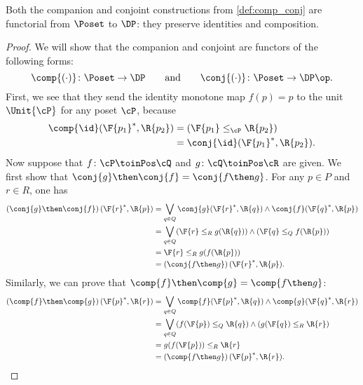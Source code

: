 \begin{lemma}
\label{prop:comp_conj}
Both the companion and conjoint constructions from \cref{def:comp_conj} are functorial from $\Poset$ to $\DP$: they preserve identities and composition.
\end{lemma}
\begin{proof}
We will show that the companion and conjoint are functors of the following forms:
\begin{equation}
\comp{(\cdot)}\colon\Poset\to\DP
\qquad\text{and}\qquad
\conj{(\cdot)}\colon\Poset\to\DP\op.
\end{equation}
First, we see that they send the identity monotone map $f(p)=p$ to the unit $\Unit{\cP }$ for any poset $\cP $, because 
\begin{equation}
    \begin{aligned}
        \comp{\id}(\F{p_1}^*,\R{p_2})&= (\F{p_1} \leq_{\cP} \R{p_2})\\
        &=\conj{\id}(\F{p_1}^*,\R{p_2}).
    \end{aligned}
\end{equation}
\noindent Now suppose that $f\colon  \cP \toinPos \cQ $ and $g\colon \cQ \toinPos \cR$ are given. We first show that $\conj{g}\then\conj{f}=\conj{f\then g}$.
For any $p\in P$ and $r\in R$, one has
\begin{equation}
\begin{aligned}
	\left(\conj{g}\then \conj{f}\right)(\F{r}^*,\R{p})
	&=\bigvee_{q\in Q} \conj{g}(\F{r}^*,\R{q})\wedge\conj{f}(\F{q}^*,\R{p})\\
	&=\bigvee_{q\in Q} (\F{r}\leq_R g(\R{q})) \wedge (\F{q}\leq_Q f(\R{p})) \\
	&= \F{r}\leq_R g(f(\R{p}))\\
    &=\left(\conj{f\then g}\right)(\F{r}^*,\R{p}).
\end{aligned}
\end{equation}
Similarly, we can prove that $\comp{f}\then \comp{g}=\comp{f\then g}$:
\begin{equation}
    \begin{aligned}
    \left(\comp{f}\then \comp{g}\right)(\F{p}^*,\R{r})&=\bigvee_{q\in Q} \comp{f}(\F{p}^*,\R{q})\wedge\comp{g}(\F{q}^*,\R{r})\\
    &=\bigvee_{q\in Q} (f(\F{p})\leq_Q \R{q})\wedge (g(\F{q})\leq_R \R{r})\\
    &=g(f(\F{p}))\leq_R \R{r}\\
    &=\left(\comp{f\then g}\right)(\F{p}^*,\R{r}).
    \end{aligned}
\end{equation}
\end{proof}


